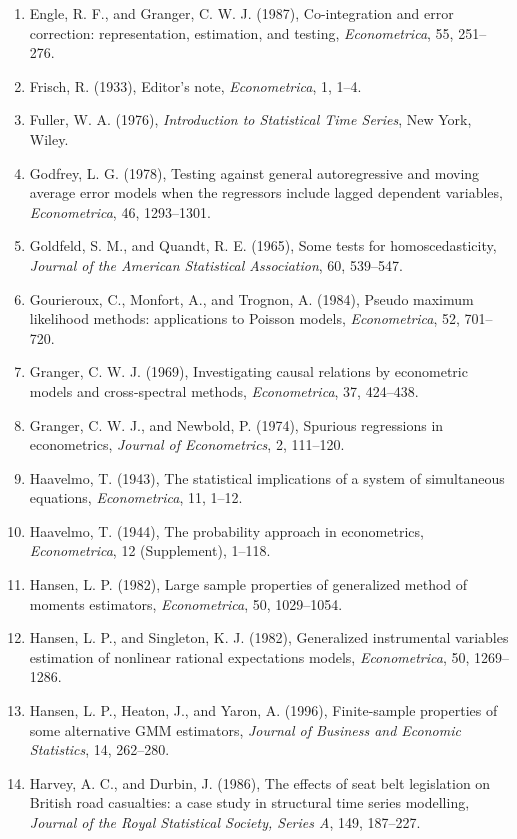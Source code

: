 \documentclass[11pt,a4paper]{article}
\numberwithin{equation}{section}
\theoremstyle{definition}
\begin{document}
\begin{enumerate}
\emph{Econometrica}, 50, 987--1007.
\item Engle, R. F., and Granger, C. W. J. (1987), Co-integration and error correction: representation, estimation, and testing, \emph{Econometrica},
55, 251--276.
\item Frisch, R. (1933), Editor's note, \emph{Econometrica}, 1, 1--4.
\item Fuller, W. A. (1976), \emph{Introduction to Statistical Time Series}, New York, Wiley.
\item Godfrey, L. G. (1978), Testing against general autoregressive and moving average error models when the regressors include lagged
dependent variables, \emph{Econometrica}, 46, 1293--1301.
\item Goldfeld, S. M., and Quandt, R. E. (1965), Some tests for homoscedasticity, \emph{Journal of the American Statistical Association}, 60, 539--547.
\item Gourieroux, C., Monfort, A., and Trognon, A. (1984), Pseudo maximum likelihood methods: applications to Poisson models, \emph{Econometrica}, 52,
701--720.
\item Granger, C. W. J. (1969), Investigating causal relations by econometric models and cross-spectral methods, \emph{Econometrica}, 37, 424--438.
\item Granger, C. W. J., and Newbold, P. (1974), Spurious regressions in econometrics, \emph{Journal of Econometrics}, 2, 111--120.
\item Haavelmo, T. (1943), The statistical implications of a system of simultaneous equations, \emph{Econometrica}, 11, 1--12.
\item Haavelmo, T. (1944), The probability approach in econometrics, \emph{Econometrica}, 12 (Supplement), 1--118.
\item Hansen, L. P. (1982), Large sample properties of generalized method of moments estimators, \emph{Econometrica}, 50, 1029--1054.
\item Hansen, L. P., and Singleton, K. J. (1982), Generalized instrumental variables estimation of nonlinear rational expectations models,
\emph{Econometrica}, 50, 1269--1286.
\item Hansen, L. P., Heaton, J., and Yaron, A. (1996), Finite-sample properties of some alternative GMM estimators, \emph{Journal of Business and
Economic Statistics}, 14, 262--280.
\item Harvey, A. C., and Durbin, J. (1986), The effects of seat belt legislation on British road casualties: a case study in structural time series
modelling, \emph{Journal of the Royal Statistical Society, Series A}, 149, 187--227.

\end{enumerate}
\end{document}
